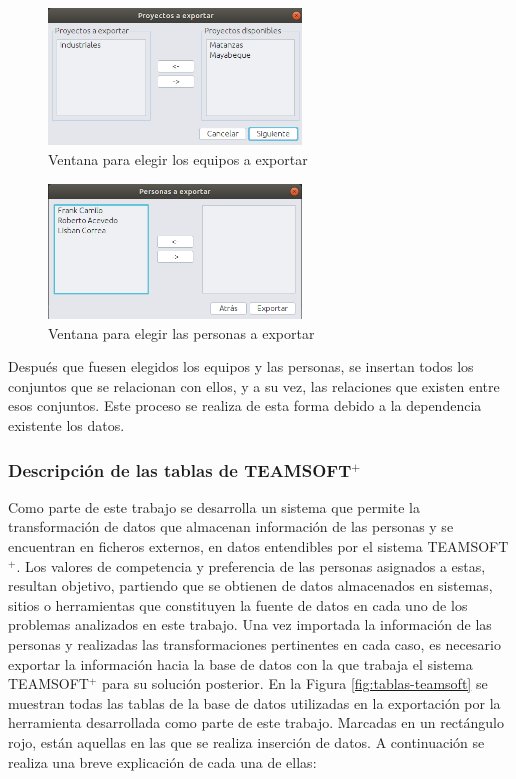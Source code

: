 \begin{figure}[H]
	\centering
	\includegraphics[width=0.6\textwidth]{figuras/exportarEquipo.png}
	\caption{Ventana para elegir los equipos a exportar}\label{fig:equipos-exportar}
\end{figure}   

\begin{figure}[H]
	\centering
	\includegraphics[width=0.6\textwidth]{figuras/exportarPersonas.png}
	\caption{Ventana para elegir las personas a exportar}\label{fig:personas-exportar}
\end{figure}   

Después que fuesen elegidos los equipos y las personas, se insertan todos los conjuntos que se relacionan con ellos, y a su vez, las relaciones que existen entre esos conjuntos. Este proceso se realiza de esta forma debido a la dependencia existente los datos.
 
\subsubsection{Descripción de las tablas de TEAMSOFT$^+$}
Como parte de este trabajo se desarrolla un sistema que permite la transformación de datos que almacenan información de las personas y se encuentran en ficheros externos, en datos entendibles por el sistema TEAMSOFT$^+$. Los valores de competencia y preferencia de las personas asignados a estas, resultan objetivo, partiendo que se obtienen de datos almacenados en sistemas, sitios o herramientas que constituyen la fuente de datos en cada uno de los problemas analizados en este trabajo. Una vez importada la información de las personas y realizadas las transformaciones pertinentes en cada caso, es necesario exportar la información hacia la base de datos con la que trabaja el sistema TEAMSOFT$^+$ para su solución posterior. En la Figura \ref{fig:tablas-teamsoft} se muestran todas las tablas de la base de datos utilizadas en la exportación por la herramienta desarrollada como parte de este trabajo. Marcadas en un rectángulo rojo, están aquellas en las que se realiza inserción de datos. A continuación se realiza una breve explicación de cada una de ellas:

